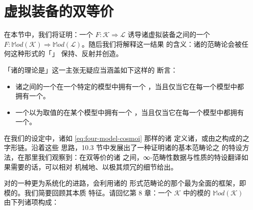 \providecommand{\Mod}{\mathbb{M}od}
\providecommand{\Fun}{\operatorname{Fun}}
\providecommand{\HomA}{\mathrm{Hom}_{A}}
\providecommand{\HomB}{\mathrm{Hom}_{B}}
\providecommand{\Hom}{\mathrm{Hom}}

\section{虚拟装备的双等价}\label{sec:biequivalence-of-virtual-equipments}

在本节中，我们将证明：一个\trCosmologicalBiequivalence{}
$F\colon\mathcal{K}\Rightarrow\mathcal{L}$ 诱导诸虚拟装备之间的一个%
\emph{\trBiequivalence}
$F\colon\Mod(\mathcal{K})\Rightarrow\Mod(\mathcal{L})$。随后我们将解释这一结果
的含义：诸\trInfinityCategory{}的范畴论会被任何这种形式的「\trChangeOfModel{}」%
\trFunctor{}保持、反射并创造。

「诸\trInfinityCategory{}的理论是\trModelIndependent{}」这一主张无疑应当涵盖如下这样的
断言：
\begin{itemize}
\item 诸\trInfinityCategory{}之间的一个\trFunctor{}在一个特定的模型中拥有一个%
\trLeftAdjoint，当且仅当它在每一个模型中都拥有一个\trLeftAdjoint。
\item 一个以\trInfinityCategory{}为取值的\trDiagram{}在某个模型中拥有一个%
\trLimit，当且仅当它在每一个模型中都拥有一个\trLimit。
\end{itemize}

在我们的设定中，诸如 \eqref{eq:four-model-cosmoi} 那样的诸\trChangeOfModel{}%
\trFunctor{}定义诸\trCosmologicalBiequivalence，或由之构成的之字形链。沿着这些
思路，10.3 节中发展出了一种证明诸\trInfinityCategory{}的基本范畴论之%
\trModelIndependence{}的特设方法，在那里我们观察到：在双等价的诸%
\trInfinityCosmos{}之间，∞-范畴性数据与性质的特设翻译如果需要的话，可以相对
机械地、以极其烦冗的细节给出。

对\trModelIndependence{}的一种更为系统化的进路，会利用诸\trInfinityCategory{}的
形式范畴论的那个最为全面的框架，即模的\trVirtualEquipment。我们简要回顾其本质
特征。请回忆第 8 章：一个\trInfinityCosmos{} $\mathcal{K}$ 中的模的%
\textbf{\trVirtualDoubleCategory} $\Mod(\mathcal{K})$ 由下列诸项构成：

